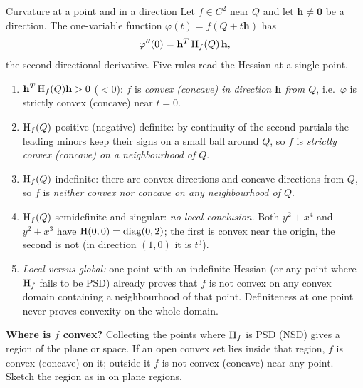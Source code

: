 \begin{rulebox}{Curvature at a point and in a direction}
Let $f\in C^{2}$ near $Q$ and let $\mathbf{h}\neq\mathbf{0}$ be a
direction. The one-variable function $\varphi(t)=f(Q+t\mathbf{h})$ has
\[
  \varphi''(0)=\mathbf{h}^{T}\operatorname{H}_f(Q)\,\mathbf{h},
\]
the second directional derivative. Five rules read the Hessian at a single
point.
\begin{enumerate}[label=(\alph*),leftmargin=1.8em,itemsep=0.3ex]
  \item $\mathbf{h}^{T}\operatorname{H}_f(Q)\mathbf{h}>0$ ($<0$): $f$ is
        \emph{convex (concave) in direction $\mathbf{h}$ from $Q$}, i.e.\
        $\varphi$ is strictly convex (concave) near $t=0$.
  \item $\operatorname{H}_f(Q)$ positive (negative) definite: by continuity of the
        second partials the leading minors keep their signs on a small ball
        around $Q$, so $f$ is \emph{strictly convex (concave) on a
        neighbourhood of $Q$}.
  \item $\operatorname{H}_f(Q)$ indefinite: there are convex directions and concave
        directions from $Q$, so $f$ is \emph{neither convex nor concave on
        any neighbourhood of $Q$}.
  \item $\operatorname{H}_f(Q)$ semidefinite and singular: \emph{no local
        conclusion}. Both $y^{2}+x^{4}$ and $y^{2}+x^{3}$ have
        $\operatorname{H}(0,0)=\operatorname{diag}(0,2)$; the first is convex near the
        origin, the second is not (in direction $(1,0)$ it is $t^{3}$).
  \item \emph{Local versus global:} one point with an indefinite Hessian
        (or any point where $\operatorname{H}_f$ fails to be PSD) already proves that
        $f$ is not convex on any convex domain containing a neighbourhood
        of that point. Definiteness at one point never proves convexity on
        the whole domain.
\end{enumerate}
\textbf{Where is $f$ convex?} Collecting the points where $\operatorname{H}_f$ is PSD
(NSD) gives a region of the plane or space. If an open convex set lies
inside that region, $f$ is convex (concave) on it; outside it $f$ is not
convex (concave) near any point. Sketch the region as in 
on plane regions.
\end{rulebox}

